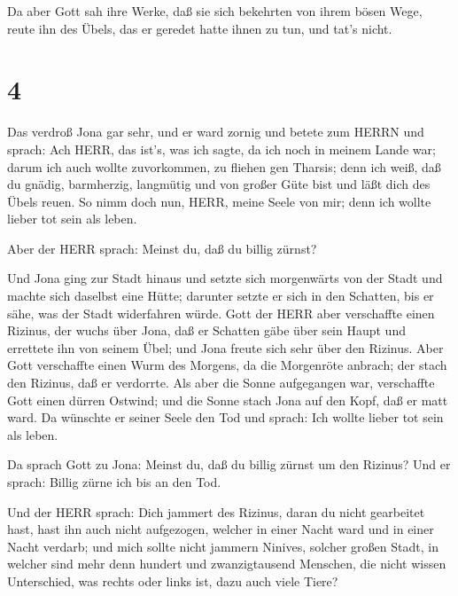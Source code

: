  Da aber Gott sah ihre Werke, daß sie sich bekehrten von
ihrem bösen Wege, reute ihn des Übels, das er geredet hatte ihnen zu
tun, und tat's nicht.

\hypertarget{section-3}{%
\section{4}\label{section-3}}

 Das verdroß Jona gar sehr, und er ward zornig 
und betete zum HERRN und sprach: Ach HERR, das ist's, was ich sagte, da
ich noch in meinem Lande war; darum ich auch wollte zuvorkommen, zu
fliehen gen Tharsis; denn ich weiß, daß du gnädig, barmherzig, langmütig
und von großer Güte bist und läßt dich des Übels reuen.  So
nimm doch nun, HERR, meine Seele von mir; denn ich wollte lieber tot
sein als leben.

 Aber der HERR sprach: Meinst du, daß du billig zürnst?

 Und Jona ging zur Stadt hinaus und setzte sich morgenwärts
von der Stadt und machte sich daselbst eine Hütte; darunter setzte er
sich in den Schatten, bis er sähe, was der Stadt widerfahren würde.
 Gott der HERR aber verschaffte einen Rizinus, der wuchs
über Jona, daß er Schatten gäbe über sein Haupt und errettete ihn von
seinem Übel; und Jona freute sich sehr über den Rizinus. 
Aber Gott verschaffte einen Wurm des Morgens, da die Morgenröte anbrach;
der stach den Rizinus, daß er verdorrte.  Als aber die Sonne
aufgegangen war, verschaffte Gott einen dürren Ostwind; und die Sonne
stach Jona auf den Kopf, daß er matt ward. Da wünschte er seiner Seele
den Tod und sprach: Ich wollte lieber tot sein als leben.

 Da sprach Gott zu Jona: Meinst du, daß du billig zürnst um
den Rizinus? Und er sprach: Billig zürne ich bis an den Tod.

 Und der HERR sprach: Dich jammert des Rizinus, daran du
nicht gearbeitet hast, hast ihn auch nicht aufgezogen, welcher in einer
Nacht ward und in einer Nacht verdarb;  und mich sollte
nicht jammern Ninives, solcher großen Stadt, in welcher sind mehr denn
hundert und zwanzigtausend Menschen, die nicht wissen Unterschied, was
rechts oder links ist, dazu auch viele Tiere?
